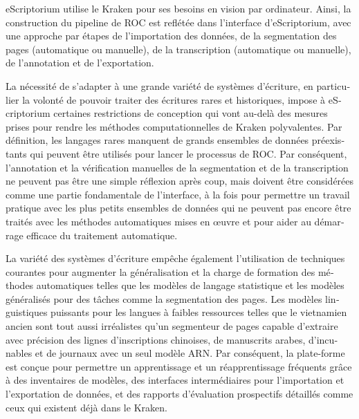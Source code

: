 \begin{french}
eScriptorium utilise le Kraken pour ses besoins en vision par ordinateur.
Ainsi, la construction du pipeline de ROC est reflétée dans l'interface
d'eScriptorium, avec une approche par étapes de l'importation des données, de
la segmentation des pages (automatique ou manuelle), de la transcription
(automatique ou manuelle), de l'annotation et de l'exportation.

La nécessité de s'adapter à une grande variété de systèmes d'écriture, en
particulier la volonté de pouvoir traiter des écritures rares et historiques,
impose à eScriptorium certaines restrictions de conception qui vont au-delà des
mesures prises pour rendre les méthodes computationnelles de Kraken
polyvalentes. Par définition, les langages rares manquent de grands ensembles
de données préexistants qui peuvent être utilisés pour lancer le processus de
ROC.  Par conséquent, l'annotation et la vérification manuelles de la
segmentation et de la transcription ne peuvent pas être une simple réflexion
après coup, mais doivent être considérées comme une partie fondamentale de
l'interface, à la fois pour permettre un travail pratique avec les plus petits
ensembles de données qui ne peuvent pas encore être traités avec les méthodes
automatiques mises en œuvre et pour aider au démarrage efficace du traitement
automatique.

La variété des systèmes d'écriture empêche également l'utilisation de techniques courantes pour augmenter la
généralisation et la charge de formation des méthodes automatiques telles que
les modèles de langage statistique et les modèles généralisés pour des tâches
comme la segmentation des pages. Les modèles linguistiques puissants pour les
langues à faibles ressources telles que le vietnamien ancien sont tout aussi
irréalistes qu'un segmenteur de pages capable d'extraire avec précision des
lignes d'inscriptions chinoises, de manuscrits arabes, d'incunables et de
journaux avec un seul modèle ARN. Par conséquent, la plate-forme est conçue
pour permettre un apprentissage et un réapprentissage fréquents grâce à des
inventaires de modèles, des interfaces intermédiaires pour l'importation et
l'exportation de données, et des rapports d'évaluation prospectifs détaillés
comme ceux qui existent déjà dans le Kraken.


\end{french}
